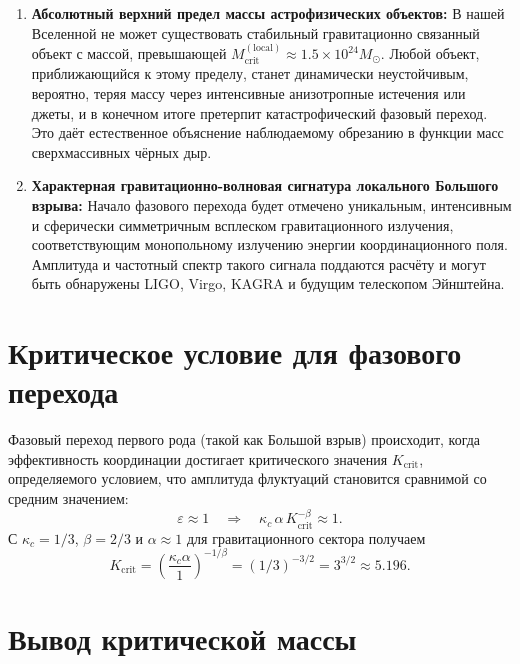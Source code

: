 \documentclass[11pt,a4paper]{article}
\newcommand{\kappac}{\kappa_c}
\newcommand{\betaf}{\beta}
\begin{document}
	\begin{enumerate}
		\item \textbf{Абсолютный верхний предел массы астрофизических объектов:} В нашей Вселенной не может существовать стабильный гравитационно связанный объект с массой, превышающей \(M_{\mathrm{crit}}^{\mathrm{(local)}} \approx 1.5 \times 10^{24} M_{\odot}\). Любой объект, приближающийся к этому пределу, станет динамически неустойчивым, вероятно, теряя массу через интенсивные анизотропные истечения или джеты, и в конечном итоге претерпит катастрофический фазовый переход. Это даёт естественное объяснение наблюдаемому обрезанию в функции масс сверхмассивных чёрных дыр.
		
		\item \textbf{Характерная гравитационно-волновая сигнатура локального Большого взрыва:} Начало фазового перехода будет отмечено уникальным, интенсивным и сферически симметричным всплеском гравитационного излучения, соответствующим монопольному излучению энергии координационного поля. Амплитуда и частотный спектр такого сигнала поддаются расчёту и могут быть обнаружены LIGO, Virgo, KAGRA и будущим телескопом Эйнштейна.
	\end{enumerate}
	
	\section{Критическое условие для фазового перехода}
	\label{sec:critical-condition}
	
	Фазовый переход первого рода (такой как Большой взрыв) происходит, когда эффективность координации достигает критического значения \(K_{\mathrm{crit}}\), определяемого условием, что амплитуда флуктуаций становится сравнимой со средним значением:
	\begin{equation}
		\varepsilon \approx 1 \quad \Longrightarrow \quad \kappac \, \alpha \, K_{\mathrm{crit}}^{-\betaf} \approx 1.
		\label{eq:critical-condition}
	\end{equation}
	С \(\kappac = 1/3\), \(\betaf = 2/3\) и \(\alpha \approx 1\) для гравитационного сектора получаем
	\begin{equation}
		K_{\mathrm{crit}} = \left( \frac{\kappac \alpha}{1} \right)^{-1/\betaf} = (1/3)^{-3/2} = 3^{3/2} \approx 5.196.
		\label{eq:Kcrit}
	\end{equation}
	
	\section{Вывод критической массы}
	\label{sec:derivation}
	
\end{document}
